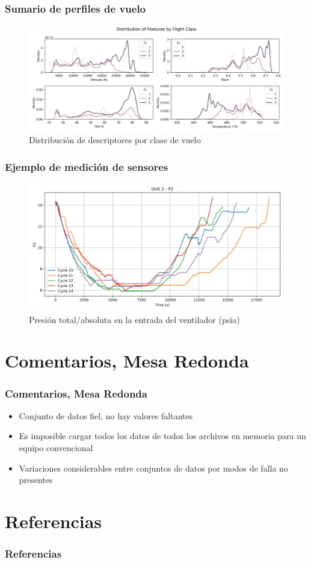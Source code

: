 \documentclass{beamer}
\begin{document}
        \begin{frame}
            \frametitle{Sumario de perfiles de vuelo}
            \begin{figure}[!htbp]
                \centering
                \includegraphics[scale=0.4]{features_per_condition_fc.png}
                \caption{Distribución de descriptores por clase de vuelo}
            \end{figure}
        \end{frame}

        \begin{frame}
            \frametitle{Ejemplo de medición de sensores}
            \begin{figure}[!htbp]
                \centering
                \includegraphics[scale=0.4]{unit_2_P2.png}
                \caption{Presión total/absoluta en la entrada del ventilador (psia)}
            \end{figure}
        \end{frame}

    \section{Comentarios, Mesa Redonda}

        \begin{frame}
            \frametitle{Comentarios, Mesa Redonda}
            \begin{itemize}
                \item Conjunto de datos fiel, no hay valores faltantes
                \item Es imposible cargar todos los datos de todos los archivos en memoria para un equipo convencional
                \item Variaciones considerables entre conjuntos de datos por modos de falla no presentes
            \end{itemize}
        \end{frame}


    \section{Referencias}
        \begin{frame}
            \frametitle{Referencias}
            \printbibliography
        \end{frame}
\end{document}
